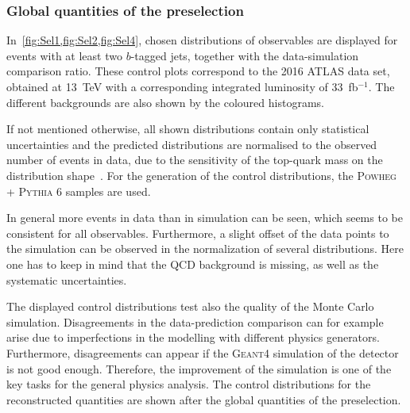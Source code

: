 \subsubsection{Global quantities of the preselection}

In~\cref{fig:Sel1,fig:Sel2,fig:Sel4}, chosen distributions of observables are displayed for events with at least two $b$-tagged jets, together with the data-simulation comparison ratio. These control plots correspond to the  2016 ATLAS data set, obtained at 13~TeV with a corresponding integrated luminosity of 33~fb$^{-1}$. The different backgrounds are also shown by the coloured histograms. 

If not mentioned otherwise, all shown distributions contain only statistical uncertainties and the  predicted distributions are normalised to the observed number of events in data, due to the sensitivity of the top-quark mass on the distribution shape~\cite{ATLAS-CONF-2017-071}. For the generation of  the control distributions, the \textsc{Powheg} + \textsc{Pythia 6} samples are used.

In general more events in data than in simulation can be seen, which seems to be consistent for all observables. Furthermore, a slight offset of the data points to the simulation can be observed in the normalization of several distributions.    
Here one has to keep in mind that the QCD background is missing, as well as the systematic uncertainties.


The displayed control distributions test also the quality of the Monte Carlo simulation.
Disagreements in the data-prediction comparison can for example  arise due to imperfections in the  modelling  with different physics generators. Furthermore, disagreements can appear if the \textsc{Geant4} simulation of the detector is not good enough. Therefore, the improvement of the simulation is one of the key tasks for the general physics analysis. 
The control distributions for the reconstructed quantities are shown after the global quantities of the preselection.





\clearpage

